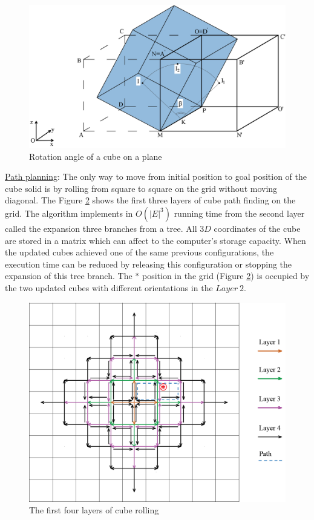 \begin{figure}[H]
\centering
	\includegraphics[width=1\textwidth]{image/cubeGeo1.png}
	\caption{Rotation angle of a cube on a plane}
	\label{fig:cubeGeo1}
\end{figure}

\noindent\uline{Path planning}: 
The only way to move from initial position to goal position of the cube solid is by rolling from square to square on the grid without moving diagonal. 
The Figure \ref{fig:cubePath0} shows the first three layers of cube path finding on the grid. The algorithm implements in $O(|E|^3)$ running time from the second layer called the expansion three branches from a tree. All $3D$ coordinates of the cube are stored in a matrix which can affect to the computer's storage capacity. 
When the updated cubes achieved one of the same previous configurations, the execution time can be reduced by releasing this configuration or stopping the expansion of this tree branch.
The $*$ position in the grid (Figure \ref{fig:cubePath0}) is occupied by the two updated cubes with different orientations in the $Layer\ 2$. 

\begin{figure}[H]
\centering
	\includegraphics[width=1\textwidth]{image/cubePath00.png}
	\caption{The first four layers of cube rolling}
	\label{fig:cubePath0}
\end{figure}

